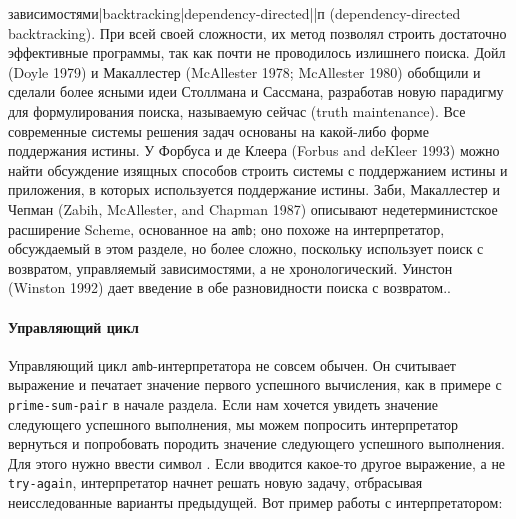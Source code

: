 {{зависимостями|backtracking|dependency-directed||п} (dependency-directed backtracking).  При всей своей
сложности, их метод
позволял строить достаточно эффективные программы, так как почти не
проводилось излишнего поиска. Дойл (Doyle 1979)
и Макаллестер (McAllester 1978;
McAllester 1980) обобщили и сделали более ясными идеи
Столлмана и Сассмана, разработав новую парадигму для формулирования
поиска, называемую сейчас  (truth maintenance).
Все современные системы решения задач основаны на какой-либо форме
поддержания истины.  У Форбуса и де Клеера 
(Forbus and deKleer 1993) 
можно найти обсуждение изящных способов строить системы с поддержанием
истины и приложения, в которых используется поддержание истины. 
Заби, 
Макаллестер 
и Чепман
(Zabih, McAllester, and Chapman 1987)
описывают недетерминистское расширение Scheme, основанное на
{\tt amb}; оно похоже на интерпретатор, обсуждаемый в этом
разделе, но более сложно, поскольку использует поиск с возвратом,
управляемый зависимостями, а не хронологический. Уинстон (Winston 
1992)
дает введение в обе разновидности поиска с возвратом.}.

\paragraph{Управляющий цикл}


Управляющий цикл {\tt amb}-интерпретатора не
совсем обычен.  Он считывает выражение и печатает значение первого
успешного вычисления, как в примере с {\tt prime-sum-pair} в
начале раздела.  Если нам хочется увидеть значение следующего
успешного выполнения, мы можем попросить интерпретатор вернуться и
попробовать породить значение следующего успешного выполнения.  Для
этого нужно ввести символ .  Если
вводится какое-то другое выражение, а не {\tt try-again},
интерпретатор начнет решать новую задачу, отбрасывая неисследованные
варианты предыдущей.  Вот пример работы с интерпретатором:

